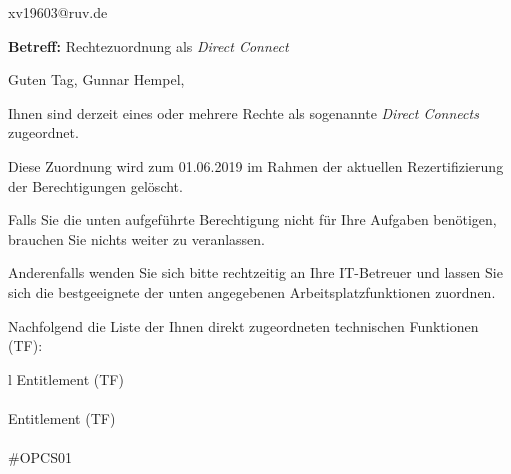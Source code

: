 \documentclass[a4paper,landscape,12pt]{letter}
\begin{document}
\begin{letter}{xv19603@ruv.de\hfill \break}
\begin{normalsize}
	\opening{\textbf{Betreff:} Rechtezuordnung als \emph{Direct Connect}}
	\begin{normalsize} \hfill
	\end{normalsize}

	\begin{normalsize}
		Guten Tag, 
	Gunnar Hempel, \hfill \break
	\end{normalsize}
	\end{normalsize}
	
\begin{normalsize}
	Ihnen sind derzeit eines oder mehrere Rechte als sogenannte \emph{Direct Connects} zugeordnet.
	
	Diese Zuordnung wird zum 01.06.2019 im Rahmen der aktuellen Rezertifizierung der Berechtigungen gelöscht.
	
	Falls Sie die unten aufgeführte Berechtigung nicht für Ihre Aufgaben benötigen, 
	brauchen Sie nichts weiter zu veranlassen.
	
	Anderenfalls wenden Sie sich bitte rechtzeitig an Ihre IT-Betreuer 
	und lassen Sie sich die bestgeeignete der unten angegebenen Arbeitsplatzfunktionen zuordnen.
	\end{normalsize}
	
\begin{normalsize}
	Nachfolgend die Liste der Ihnen direkt zugeordneten technischen Funktionen (TF):

	\begin{longtable}{l}
		Entitlement (TF) \\ \hline
		\endfirsthead
		\\\hline
		Entitlement (TF) \\ \hline
		\endhead %
		\multicolumn{1}{r@{}}{Fortsetzung \ldots}\\
		\endfoot
		\hline
		\endlastfoot
	\#OPCS01\\
	\end{longtable}
	\end{normalsize}
	

\end{letter}
\end{document}
